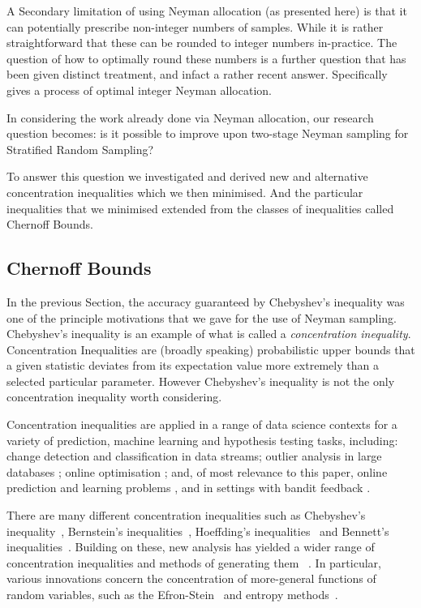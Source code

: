 A Secondary limitation of using Neyman allocation (as presented here) is that it can potentially prescribe non-integer numbers of samples. While it is rather straightforward that these can be rounded to integer numbers in-practice. The question of how to optimally round these numbers is a further question that has been given distinct treatment, and infact a rather recent answer.
Specifically \cite{WRIGHT201750} gives a process of optimal integer Neyman allocation.

In considering the work already done via Neyman allocation, our research question becomes:
is it possible to improve upon two-stage Neyman sampling for Stratified Random Sampling?

To answer this question we investigated and derived new and alternative concentration inequalities which we then minimised.  And the particular inequalities that we minimised extended from the classes of inequalities called Chernoff Bounds.

\subsection{Chernoff Bounds}

In the previous Section, the accuracy guaranteed by Chebyshev's inequality was one of the principle motivations that we gave for the use of Neyman sampling.
Chebyshev's inequality is an example of what is called a \textit{concentration inequality}.
Concentration Inequalities are (broadly speaking) probabilistic upper bounds that a given statistic deviates from its expectation value more extremely than a selected particular parameter.
However Chebyshev's inequality is not the only concentration inequality worth considering.

Concentration inequalities are applied in a range of data science contexts for a variety of prediction, machine learning and hypothesis testing tasks, including:
change detection \cite{KiferShaiGehrke2004,8000571} 
and classification \cite{Zia-UrRehman2012} in data streams;
outlier analysis in large databases \cite{Aggarwal2015};
online optimisation \cite{FlaxmanKalaiMcMahan2005,AgarwalDekelXiao2010}; and, of most relevance to this paper, 
online prediction and learning problems \cite{%
Mnih:2008:EBS:1390156.1390241,DBLP:conf/aaai/ThomasTG15,Maurer50empiricalbernstein},
and in settings with bandit feedback \cite{AuerCesa-BianchiEtal_SIAM2003,AudibertBubeck_COLT2009,Tran-ThanhChapmanRJ_AAAI2009}.

There are many different concentration inequalities such as Chebyshev's inequality~\cite{Chebyshev1}, Bernstein's inequalities~\cite{Burnstein1}, 
Hoeffding's inequalities~\cite{hoeffding1} and Bennett's inequalities~\cite{10.2307/2282438}.
Building on these, new analysis has yielded a wider range of concentration inequalities and methods of generating them ~\cite{MR3363542,Boucheron2004}. 
In particular, various innovations concern the concentration of more-general functions of random variables, such as 
the Efron-Stein~\cite{efron1981} and 
entropy methods~\cite{Boucheron_concentrationinequalities}.%


